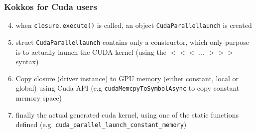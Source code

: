 \begin{frame}[fragile=singleslide]
  \frametitle{Kokkos for Cuda users}

  
  \begin{enumerate}
    \setcounter{enumi}{3}
  \item when \texttt{closure.execute()} is called, an object \texttt{CudaParallellaunch} is created
  \item struct \texttt{CudaParallellaunch} contains only a constructor, which only purpose is to actually launch the CUDA kernel (using the $<<<$ ... $>>>$ syntax)
  \item Copy closure (driver instance) to GPU memory (either constant, local or global) using Cuda API (e.g \texttt{cudaMemcpyToSymbolAsync} to copy constant memory space)
  \item finally the actual generated cuda kernel, using one of the static functions defined (e.g. \texttt{cuda\_parallel\_launch\_constant\_memory})
  \end{enumerate}

\end{frame}
